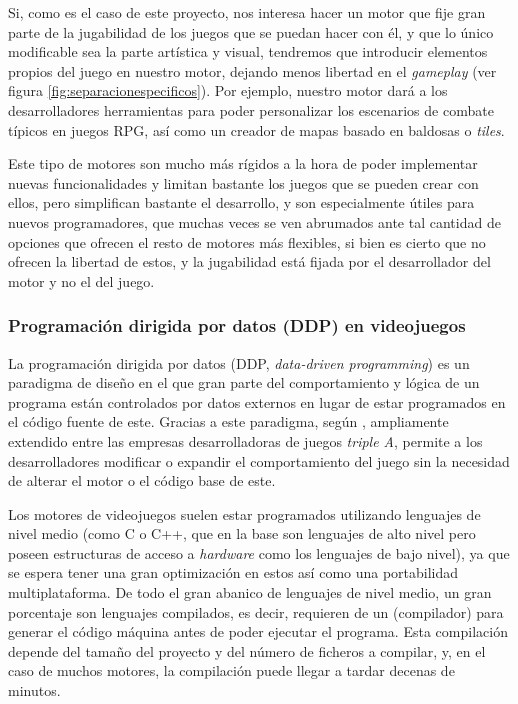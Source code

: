 \medskip

Si, como es el caso de este proyecto, nos interesa hacer un motor que fije gran parte de la jugabilidad de los juegos que se puedan hacer con él, y que lo único modificable sea la parte artística y visual, tendremos que introducir elementos propios del juego en nuestro motor, dejando menos libertad en el \textit{gameplay} (ver figura \ref{fig:separacionespecificos}). Por ejemplo, nuestro motor dará a los desarrolladores herramientas para poder personalizar los escenarios de combate típicos en juegos RPG, así como un creador de mapas basado en baldosas o \textit{tiles}. 

\smallskip

Este tipo de motores son mucho más rígidos a la hora de poder implementar nuevas funcionalidades y limitan bastante los juegos que se pueden crear con ellos, pero simplifican bastante el desarrollo, y son especialmente útiles para nuevos programadores, que muchas veces se ven abrumados ante tal cantidad de opciones que ofrecen el resto de motores más flexibles, si bien es cierto que no ofrecen la libertad de estos, y la jugabilidad está fijada por el desarrollador del motor y no el del juego.

\subsubsection{Programación dirigida por datos (DDP) en videojuegos}
La programación dirigida por datos (DDP, \textit{data-driven programming}) es un paradigma de diseño en el que gran parte del comportamiento y lógica de un programa están controlados por datos externos en lugar de estar programados en el código fuente de este. Gracias a este paradigma, según \citeauthor{gregory2018game}, ampliamente extendido entre las empresas desarrolladoras de juegos \textit{triple A}, permite a los desarrolladores modificar o expandir el comportamiento del juego sin la necesidad de alterar el motor o el código base de este.

\medskip

Los motores de videojuegos suelen estar programados utilizando lenguajes de  nivel medio (como C o C++, que en la base son lenguajes de alto nivel pero poseen estructuras de acceso a \textit{hardware} como los lenguajes de bajo nivel), ya que se espera tener una gran optimización en estos así como una portabilidad multiplataforma. De todo el gran abanico de lenguajes de nivel medio, un gran porcentaje son lenguajes compilados, es decir, requieren de un  (compilador) para generar el código máquina antes de poder ejecutar el programa. Esta compilación depende del tamaño del proyecto y del número de ficheros a compilar, y, en el caso de muchos motores, la compilación puede llegar a tardar decenas de minutos.

